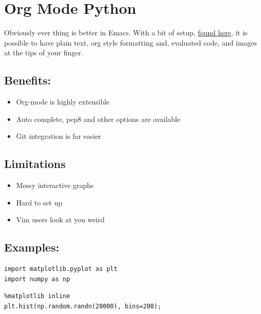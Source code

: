 \documentclass[11pt]{article}
\author{Kai Lukowiak}
\date{\today}
\title{}
\begin{document}
\tableofcontents

\section{Org Mode Python}
\label{sec:org644b27f}

Obviously ever thing is better in Emacs. With a bit of setup, \href{https://github.com/gregsexton/ob-ipython}{found here}, it is
possible to have plain text, org style formatting and, evaluated code, and images
at the tips of your finger.

\subsection{Benefits:}
\label{sec:orgdcdc452}
\begin{itemize}
\item Org-mode is highly extensible
\item Auto complete, pep8 and other options are available
\item Git integration is far easier
\end{itemize}


\subsection{Limitations}
\label{sec:org2a0b1f1}
\begin{itemize}
\item Messy interactive graphs
\item Hard to set up
\item Vim users look at you weird
\end{itemize}

\subsection{Examples:}
\label{sec:orgc798505}

\begin{verbatim}
import matplotlib.pyplot as plt
import numpy as np
\end{verbatim}

\begin{verbatim}
%matplotlib inline
plt.hist(np.random.randn(20000), bins=200);
\end{verbatim}
\end{document}
